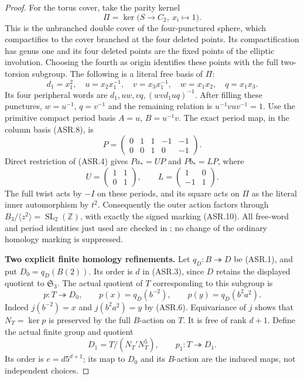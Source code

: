 \begin{proof}
For the torus cover, take the parity kernel
\[
 \Pi=\ker\bigl(S\longrightarrow C_2,
                         \ x_i\longmapsto1\bigr).
                                                        \tag{ASR.7}
\]
This is the unbranched double cover of the four-punctured
sphere, which compactifies to the cover branched at the four
deleted points.  Its compactification has genus one and its
four deleted points are the fixed points of the elliptic
involution.  Choosing the fourth as origin identifies these
points with the full two-torsion subgroup.
The following is a literal free basis of $\Pi$:
\[
 d_1=x_1^2,\quad u=x_2x_1^{-1},\quad v=x_3x_1^{-1},
 \quad w=x_1x_2,\quad q=x_1x_3.                        \tag{ASR.8}
\]
Its four peripheral words are
$d_1,uw,vq,(wvd_1uq)^{-1}$.
After filling these punctures, $w=u^{-1}$, $q=v^{-1}$ and
the remaining relation is $u^{-1}vuv^{-1}=1$.
Use the primitive compact period basis $A=u$, $B=u^{-1}v$.
The exact period map, in the column basis (ASR.8), is
\[
 P=\begin{pmatrix}0&1&1&-1&-1\\0&0&1&0&-1\end{pmatrix}.
                                                        \tag{ASR.9}
\]
Direct restriction of (ASR.4) gives
$P a_*=U P$ and $P b_*=L P$, where
\[
 U=\begin{pmatrix}1&1\\0&1\end{pmatrix},\qquad
 L=\begin{pmatrix}1&0\\-1&1\end{pmatrix}.
                                                        \tag{ASR.10}
\]
The full twist acts by $-I$ on these periods, and its square
acts on $\Pi$ as the literal inner automorphism by $t^2$.
Consequently the outer action factors through
$B_3/\langle z^2\rangle=\operatorname{SL}_2(\mathbb Z)$,
with exactly the signed marking (ASR.10).
All free-word and period identities just used are checked in
; no change of the
ordinary homology marking is suppressed.

\par\medskip\noindent\textbf{Two explicit finite homology refinements.}
Let $q_D:B\twoheadrightarrow D$ be (ASR.1), and put
$D_0=q_D(B(2))$.  Its order is $d$ in (ASR.3), since
$D$ retains the displayed quotient to $\mathfrak S_3$.
The actual quotient of $T$ corresponding to this subgroup is
\[
 p:T\twoheadrightarrow D_0,\qquad
 p(x)=q_D(b^{-2}),\qquad p(y)=q_D(b^2a^2).             \tag{ASR.11}
\]
Indeed $j(b^{-2})=x$ and $j(b^2a^2)=y$ by (ASR.6).
Equivariance of $j$ shows that $N_T=\ker p$ is preserved
by the full $B$-action on $T$.
It is free of rank $d+1$.
Define the actual finite group and quotient
\[
 D_1=T/(N_T'N_T^5),\qquad p_1:T\twoheadrightarrow D_1.
                                                        \tag{ASR.12}
\]
Its order is $e=d5^{d+1}$; its map to $D_0$ and its
$B$-action are the induced maps, not independent choices.


\end{proof}
